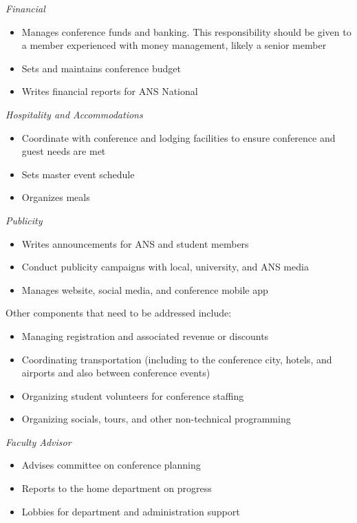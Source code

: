 \documentclass[12pt]{article}
\begin{document}
\emph{Financial}
\begin{itemize}
    \item Manages conference funds and banking. This responsibility should be given to a member experienced with money management, likely a senior member
    \item Sets and maintains conference budget
    \item Writes financial reports for ANS National
\end{itemize}

\emph{Hospitality and Accommodations}
\begin{itemize}
    \item Coordinate with conference and lodging facilities to ensure conference and guest needs are met
    \item Sets master event schedule
    \item Organizes meals
\end{itemize}

\emph{Publicity}
\begin{itemize}
    \item Writes announcements for ANS and student members
    \item Conduct publicity campaigns with local, university, and ANS media
    \item Manages website, social media, and conference mobile app
\end{itemize}

Other components that need to be addressed include:
\begin{itemize}
    \item Managing registration and associated revenue or discounts
    \item Coordinating transportation (including to the conference city, hotels, and airports and also between conference events)
    \item Organizing student volunteers for conference staffing
    \item Organizing socials, tours, and other non-technical programming
\end{itemize}

\emph{Faculty Advisor}
\begin{itemize}
    \item Advises committee on conference planning
    \item Reports to the home department on progress
    \item Lobbies for department and administration support
\end{itemize}
\end{document}
